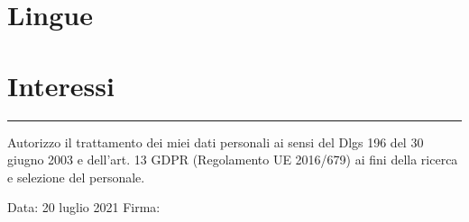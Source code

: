 \documentclass[11pt,a4paper,sans]{moderncv} %
\begin{document}
\vspace{0.5cm}



\section{Lingue}



\section{Interessi}

\renewcommand{\listitemsymbol}{-~} %



\vfill

\noindent\rule{5cm}{1pt}

Autorizzo il trattamento dei miei dati personali ai sensi del Dlgs 196 del
30 giugno 2003 e dell’art. 13 GDPR (Regolamento UE 2016/679) ai
fini della ricerca e selezione del personale.

\vspace{1cm}

Data: 20 luglio 2021 \hspace{5cm} Firma:

\vspace{1cm}
\end{document}

